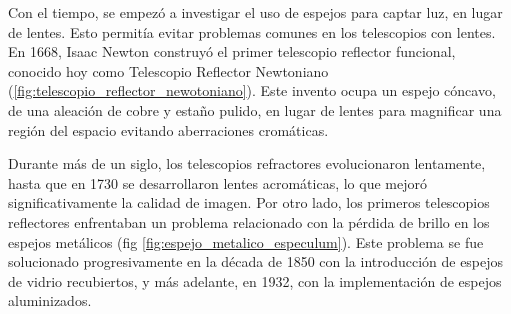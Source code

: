 Con el tiempo, se empezó a investigar el uso de espejos para captar luz, en lugar de lentes. Esto permitía evitar problemas comunes en los telescopios con lentes. En 1668, Isaac Newton construyó el primer telescopio reflector funcional, conocido hoy como Telescopio Reflector Newtoniano (\ref{fig:telescopio_reflector_newotoniano}). Este invento ocupa un espejo cóncavo, de una aleación de cobre y estaño pulido, en lugar de lentes para magnificar una región del espacio evitando aberraciones cromáticas. 

 

Durante más de un siglo, los telescopios refractores evolucionaron lentamente, hasta que en 1730 se desarrollaron lentes acromáticas, lo que mejoró significativamente la calidad de imagen. Por otro lado, los primeros telescopios reflectores enfrentaban un problema relacionado con la pérdida de brillo en los espejos metálicos (fig \ref{fig:espejo_metalico_especulum}). Este problema se fue solucionado progresivamente en la década de 1850 con la introducción de espejos de vidrio recubiertos, y más adelante, en 1932, con la implementación de espejos aluminizados.


